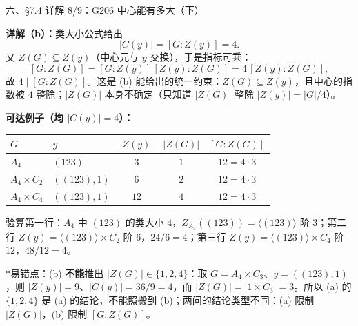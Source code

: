\documentclass[aspectratio=169,10pt,fontset=none]{ctexbeamer}
\newcommand{\key}[1]{\textcolor{ink}{\bfseries #1}}
\newcommand{\starpt}{\textcolor{accent}{\bfseries$\ast$}}
\begin{document}
\begin{frame}[t]{六、\S7.4 详解 8/9：G206 中心能有多大（下）}
\scriptsize

\key{详解（b）：}类大小公式给出
\[ |C(y)|=[G:Z(y)]=4. \]
又 $Z(G)\subseteq Z(y)$（中心元与 $y$ 交换），于是指标可乘：
\[ [G:Z(G)]=[G:Z(y)]\,[Z(y):Z(G)]=4\,[Z(y):Z(G)], \]
故 $4\mid[G:Z(G)]$。这是 (b) 能给出的统一约束：$Z(G)\subseteq Z(y)$，且中心的指数被 $4$ 整除；$|Z(G)|$ 本身不确定（只知道 $|Z(G)|$ 整除 $|Z(y)|=|G|/4$）。

\key{可达例子（均 $|C(y)|=4$）：}
\begin{center}
\renewcommand{\arraystretch}{1.06}
\begin{tabular}{@{}l l c c c@{}}
\toprule
$G$ & $y$ & $|Z(y)|$ & $|Z(G)|$ & $[G:Z(G)]$\\
\midrule
$A_4$ & $(123)$ & $3$ & $1$ & $12=4\cdot3$\\
$A_4\times C_2$ & $((123),1)$ & $6$ & $2$ & $12=4\cdot3$\\
$A_4\times C_4$ & $((123),1)$ & $12$ & $4$ & $12=4\cdot3$\\
\bottomrule
\end{tabular}
\end{center}
验算第一行：$A_4$ 中 $(123)$ 的类大小 $4$，$Z_{A_4}((123))=\langle(123)\rangle$ 阶 $3$；第二行 $Z(y)=\langle(123)\rangle\times C_2$ 阶 $6$，$24/6=4$；第三行 $Z(y)=\langle(123)\rangle\times C_4$ 阶 $12$，$48/12=4$。

\starpt 易错点：(b) \textbf{不能}推出 $|Z(G)|\in\{1,2,4\}$：取 $G=A_4\times C_3$、$y=((123),1)$，则 $|Z(y)|=9$、$|C(y)|=36/9=4$，而 $|Z(G)|=|1\times C_3|=3$。所以 (a) 的 $\{1,2,4\}$ 是 (a) 的结论，不能照搬到 (b)；两问的结论类型不同：(a) 限制 $|Z(G)|$，(b) 限制 $[G:Z(G)]$。
\end{frame}
\end{document}
